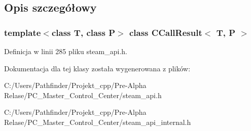 \subsection{Opis szczegółowy}
\subsubsection*{template$<$class T, class P$>$\newline
class C\+Call\+Result$<$ T, P $>$}



Definicja w linii 285 pliku steam\+\_\+api.\+h.



Dokumentacja dla tej klasy została wygenerowana z plików\+:\begin{DoxyCompactItemize}
\item 
C\+:/\+Users/\+Pathfinder/\+Projekt\+\_\+cpp/\+Pre-\/\+Alpha Relase/\+P\+C\+\_\+\+Master\+\_\+\+Control\+\_\+\+Center/steam\+\_\+api.\+h\item 
C\+:/\+Users/\+Pathfinder/\+Projekt\+\_\+cpp/\+Pre-\/\+Alpha Relase/\+P\+C\+\_\+\+Master\+\_\+\+Control\+\_\+\+Center/steam\+\_\+api\+\_\+internal.\+h\end{DoxyCompactItemize}
